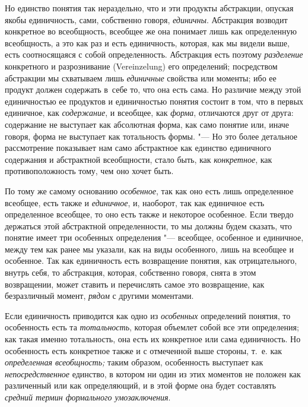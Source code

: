 Но единство понятия так нераздельно, что и эти продукты абстракции,
опуская якобы единичность, сами, собственно говоря, {\em единичны}.
Абстракция возводит конкретное во всеобщность, всеобщее же
она понимает лишь как определенную всеобщность, а это как раз и есть
единичность, которая, как мы видели выше, есть соотносящаяся с собой
определенность. Абстракция есть поэтому {\em разделение}
конкретного и разрознивание (Verein\-zelung) его
определений; посредством абстракции мы схватываем лишь
{\em единичные} свойства
или моменты; ибо ее продукт должен содержать в~себе то, что она есть сама.
Но различие между этой единичностью ее продуктов и единичностью понятия
состоит в том, что в первых единичное, как
{\em содержание}, и всеобщее, как {\em форма},
отличаются друг от друга: содержание не выступает как
абсолютная форма, как само понятие или, иначе говоря, форма не выступает
как тотальность формы. "--- Но это более детальное рассмотрение
показывает нам само абстрактное как единство единичного содержания и
абстрактной всеобщности, стало быть, как
{\em конкретное}, как противоположность тому, чем оно хочет быть.

По тому же самому основанию {\em особенное}, так как
оно есть лишь определенное всеобщее, есть также и {\em единичное}, и,
наоборот, так как единичное есть определенное всеобщее, то оно есть также и
некоторое особенное. Если твердо держаться этой абстрактной определенности,
то мы должны будем сказать, что понятие имеет три особенных
определения "--- всеобщее, особенное и
единичное, между тем как ранее мы указали, как на виды особенного, лишь на
всеобщее и особенное. Так как единичность есть возвращение понятия, как
отрицательного, внутрь себя, то абстракция, которая, собственно говоря,
снята в этом возвращении, может ставить и перечислять самое это
возвращение, как безразличный момент, {\em рядом} с другими моментами.

Если единичность приводится как одно из {\em особенных}
определений понятия, то особенность есть та {\em тотальность},
которая объемлет собой все эти определения; как такая именно
тотальность, она есть их конкретное или сама единичность. Но особенность
есть конкретное также и с отмеченной выше стороны, т.~е. как
{\em определенная всеобщность;}
таким образом, особенность выступает как {\em непосредственное}
единство, в котором ни один из этих моментов не положен как
различенный или как определяющий, и в этой форме она будет составлять
{\em средний термин формального умозаключения}.

